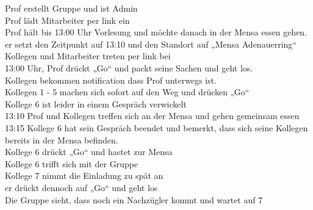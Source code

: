 Prof erstellt Gruppe und ist Admin\\
Prof lädt Mitarbeiter per link ein\\
Prof hält bis 13:00 Uhr Vorlesung und möchte danach in der Mensa essen gehen.\\
er setzt den Zeitpunkt auf 13:10 und den Standort auf „Mensa Adenauerring“\\
Kollegen und Mitarbeiter treten per link bei\\
13:00 Uhr, Prof drückt „Go“ und packt seine Sachen und geht los.\\
Kollegen bekommen notification dass Prof unterwegs ist.\\
Kollegen 1 - 5 machen sich sofort auf den Weg und drücken „Go“\\
Kollege 6 ist leider in einem Gespräch verwickelt\\
13:10 Prof und Kollegen treffen sich an der Mensa und gehen gemeinsam essen\\
13:15 Kollege 6 hat sein Gespräch beendet und bemerkt, dass sich seine Kollegen bereits in der Mensa befinden.\\
Kollege 6 drückt „Go“ und hastet zur Mensa\\
Kollege 6 trifft sich mit der Gruppe\\
Kollege 7 nimmt die Einladung zu spät an\\
er drückt dennoch auf „Go“ und geht los\\
Die Gruppe sieht, dass noch ein Nachzügler kommt und wartet auf 7\\
